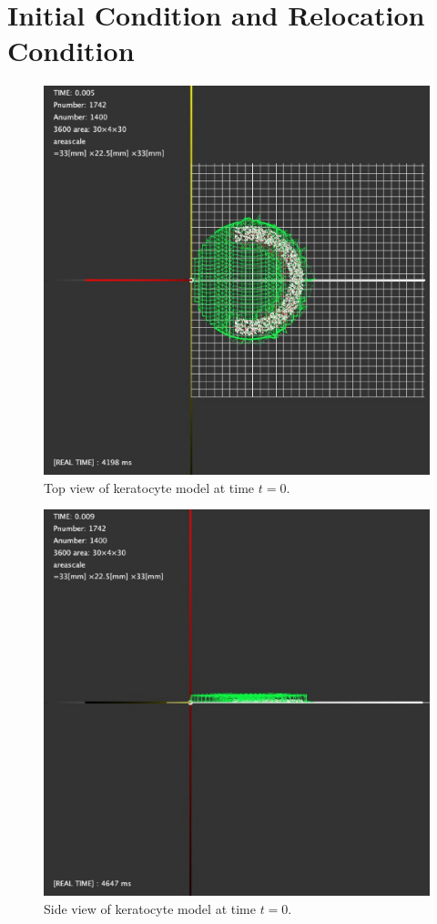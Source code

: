 \documentclass[a4paper,12pt]{book}
\begin{document}
\section{Initial Condition and Relocation  Condition}
\begin{figure}[tbp]
\centering
\includegraphics[scale=0.25]{top.eps}
\caption{Top view of keratocyte model at time $t=0$.}
\label{fig:top0}
\end{figure}
\begin{figure}[tbp]
\centering
\includegraphics[scale=0.25]{side.eps}
\caption{Side view of keratocyte model at time $t=0$.}
\label{fig:side0}
\end{figure}
\end{document}
